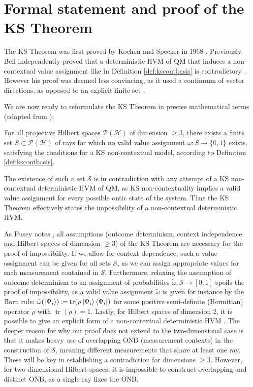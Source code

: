 \section{Formal statement and proof of the KS Theorem}
\label{sec:formalproof}

The KS Theorem was first proved by Kochen and Specker in 1968 \cite{Kochen1968}. Previously, Bell independently proved that a deterministic HVM of QM that induces a non-contextual value assignment like in Definition \ref{def:kscontbasis} is contradictory \cite{Bell1966}. However his proof was deemed less convincing, as it used a continuum of vector directions, as opposed to an explicit finite set \cite{Mermin1993}.

We are now ready to reformulate the KS Theorem in precise mathematical terms (adapted from \cite{Pusey2019}):

\begin{theorem}\hfill\break
\label{thm:ksthm}
For all projective Hilbert spaces $\mathcal{P}(\mathcal{H})$ of dimension $\geq3$, there exists a finite set $S\subset\mathcal{P}(\mathcal{H})$ of rays for which no valid value assignment $\omega:S\rightarrow\{0,1\}$ exists, satisfying the conditions for a KS non-contextual model, according to Definition \ref{def:kscontbasis}.
\end{theorem}

The existence of such a set $\mathcal{S}$ is in contradiction with any attempt of a KS non-contextual deterministic HVM of QM, as KS non-contextuality implies a valid value assignment for every possible ontic state of the system. Thus the KS Theorem effectively states the impossibility of a non-contextual deterministic HVM. 

As Pusey notes \cite{Pusey2019}, all assumptions (outcome determinism, context independence and Hilbert spaces of dimension $\ge3$) of the KS Theorem are necessary for the proof of impossibility. If we allow for context dependence, such a value assignment can be given for all sets $\mathcal{S}$, as we can assign appropriate values for each measurement contained in $\mathcal{S}$. Furthermore, relaxing the assumption of outcome determinism to an assignment of probabilities $\tilde{\omega}:\mathcal{S}\rightarrow\left[0,1\right]$ spoils the proof of impossibility, as a valid value assignment $\tilde{\omega}$ is given for instance by the Born rule: $\tilde{\omega}(\ket{\Psi_{i}} )\coloneqq\operatorname{tr}(\rho\ket{\Psi_{i}} \bra{\Psi_{i}})$ for some positive semi-definite (Hermitian) operator $\rho$ with $\operatorname{tr}(\rho)=1$. Lastly, for Hilbert spaces of dimension 2, it is possible to give an explicit form of a non-contextual deterministic HVM \cite{Mermin1993}. The deeper reason for why our proof does not extend to the two-dimensional case is that it makes heavy use of overlapping ONB (measurement contexts) in the construction of $\mathcal{S}$, meaning different measurements that share at least one ray. These will be key in establishing a contradiction for dimensions $\geq3$. However, for two-dimensional Hilbert spaces, it is impossible to construct overlapping and distinct ONB, as a single ray fixes the ONB.

